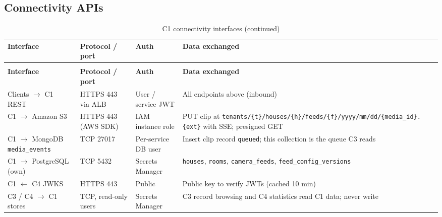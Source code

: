 \subsection{Connectivity APIs}
\begin{longtable}{L{3.2cm}L{2.6cm}L{2.4cm}L{6.4cm}}
\caption{C1 connectivity interfaces}\label{tab:c1-conn}\\
\toprule
\textbf{Interface} & \textbf{Protocol / port} & \textbf{Auth} & \textbf{Data exchanged} \\
\midrule
\endfirsthead
\caption[]{C1 connectivity interfaces (continued)}\\
\toprule
\textbf{Interface} & \textbf{Protocol / port} & \textbf{Auth} & \textbf{Data exchanged} \\
\midrule
\endhead
Clients $\rightarrow$ C1 REST & HTTPS 443 via ALB & User / service JWT & All endpoints above (inbound) \\
C1 $\rightarrow$ Amazon S3 & HTTPS 443 (AWS SDK) & IAM instance role & PUT clip at \texttt{tenants/\{t\}/\allowbreak houses/\{h\}/\allowbreak feeds/\{f\}/\allowbreak yyyy/mm/dd/\allowbreak\{media\_id\}.\{ext\}} with SSE; presigned GET \\
C1 $\rightarrow$ MongoDB \texttt{media\_events} & TCP 27017 & Per-service DB user & Insert clip record \texttt{queued}; this collection is the queue C3 reads \\
C1 $\rightarrow$ PostgreSQL (own) & TCP 5432 & Secrets Manager & \texttt{houses}, \texttt{rooms}, \texttt{camera\_feeds}, \texttt{feed\_config\_versions} \\
C1 $\leftarrow$ C4 JWKS & HTTPS 443 & Public & Public key to verify JWTs (cached 10 min) \\
C3 / C4 $\rightarrow$ C1 stores & TCP, read-only users & Secrets Manager & C3 record browsing and C4 statistics read C1 data; never write \\
\bottomrule
\end{longtable}

